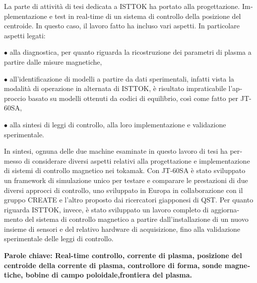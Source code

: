 \begin{otherlanguage}{italian}
	La parte di attività di tesi dedicata a ISTTOK ha portato alla progettazione. Implementazione e test in real-time di un sistema di controllo della posizione del centroide. In questo caso, il lavoro fatto ha incluso vari aspetti. In particolare aspetti legati:\smallskip
	
	$\bullet$ alla diagnostica, per quanto riguarda la ricostruzione dei parametri di plasma a partire dalle misure magnetiche, \smallskip
	
	$\bullet$ all’identificazione di modelli a partire da dati sperimentali, infatti vista la modalità di operazione in alternata di ISTTOK, è risultato impraticabile l’approccio basato su modelli ottenuti da codici di equilibrio, così come fatto per JT-60SA,\smallskip
	
	$\bullet$ alla sintesi di leggi di controllo, alla loro implementazione e validazione sperimentale.\smallskip
	
	In sintesi, ognuna delle due machine esaminate in questo lavoro di tesi ha permesso di considerare diversi aspetti relativi alla progettazione e implementazione di sistemi di controllo magnetico nei tokamak. Con JT-60SA è stato sviluppato un framework di simulazione unico per testare e comparare le prestazioni di due diversi approcci di controllo, uno sviluppato in Europa in collaborazione con il gruppo CREATE e l’altro proposto dai ricercatori giapponesi di QST. Per quanto riguarda ISTTOK, invece, è stato sviluppato un lavoro completo di aggiornamento del sistema di controllo magnetico a partire dall’installazione di un nuovo insieme di sensori e del relativo hardware di acquisizione, fino alla validazione sperimentale delle leggi di controllo.
	
\vfill

\textbf{Parole chiave: Real-time controllo, corrente di plasma, posizione del centroide della corrente di plasma, controllore di forma, sonde magnetiche, bobine di campo poloidale,frontiera del plasma. } 
\end{otherlanguage}



